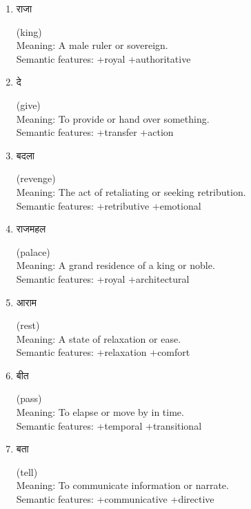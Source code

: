 \documentclass{article}
\begin{document}
\begin{enumerate}
\item \begin{hindi} राजा \end{hindi} (king) \\
Meaning: A male ruler or sovereign. \\
Semantic features: +royal +authoritative

\item \begin{hindi} दे \end{hindi} (give) \\
Meaning: To provide or hand over something. \\
Semantic features: +transfer +action

\item \begin{hindi} बदला \end{hindi} (revenge) \\
Meaning: The act of retaliating or seeking retribution. \\
Semantic features: +retributive +emotional

\item \begin{hindi} राजमहल \end{hindi} (palace) \\
Meaning: A grand residence of a king or noble. \\
Semantic features: +royal +architectural

\item \begin{hindi} आराम \end{hindi} (rest) \\
Meaning: A state of relaxation or ease. \\
Semantic features: +relaxation +comfort

\item \begin{hindi} बीत \end{hindi} (pass) \\
Meaning: To elapse or move by in time. \\
Semantic features: +temporal +transitional

\item \begin{hindi} बता \end{hindi} (tell) \\
Meaning: To communicate information or narrate. \\
Semantic features: +communicative +directive


\end{enumerate}
\end{document}
